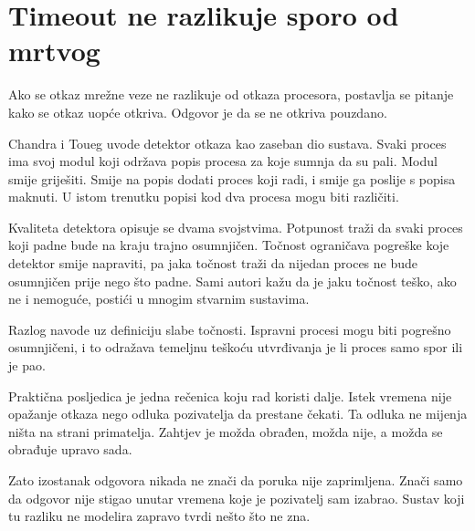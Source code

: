 \section{Timeout ne razlikuje sporo od mrtvog}
\label{sec:detekcija-otkaza}

Ako se otkaz mrežne veze ne razlikuje od otkaza procesora, postavlja se
pitanje kako se otkaz uopće otkriva. Odgovor je da se ne otkriva pouzdano.

Chandra i Toueg uvode detektor otkaza kao zaseban dio sustava. Svaki proces
ima svoj modul koji održava popis procesa za koje sumnja da su
pali\cite{chandra1996failuredetectors}. Modul smije griješiti. Smije na
popis dodati proces koji radi, i smije ga poslije s popisa maknuti. U
istom trenutku popisi kod dva procesa mogu biti različiti.

Kvaliteta detektora opisuje se dvama svojstvima. Potpunost traži da svaki
proces koji padne bude na kraju trajno osumnjičen. Točnost ograničava
pogreške koje detektor smije napraviti, pa jaka točnost traži da nijedan
proces ne bude osumnjičen prije nego što padne. Sami autori kažu da je
jaku točnost teško, ako ne i nemoguće, postići u mnogim stvarnim sustavima.

Razlog navode uz definiciju slabe točnosti. Ispravni procesi mogu biti
pogrešno osumnjičeni, i to odražava temeljnu teškoću utvrđivanja je li
proces samo spor ili je pao.

Praktična posljedica je jedna rečenica koju rad koristi dalje. Istek
vremena nije opažanje otkaza nego odluka pozivatelja da prestane čekati.
Ta odluka ne mijenja ništa na strani primatelja. Zahtjev je možda obrađen,
možda nije, a možda se obrađuje upravo sada.

Zato izostanak odgovora nikada ne znači da poruka nije zaprimljena. Znači
samo da odgovor nije stigao unutar vremena koje je pozivatelj sam izabrao.
Sustav koji tu razliku ne modelira zapravo tvrdi nešto što ne zna.

